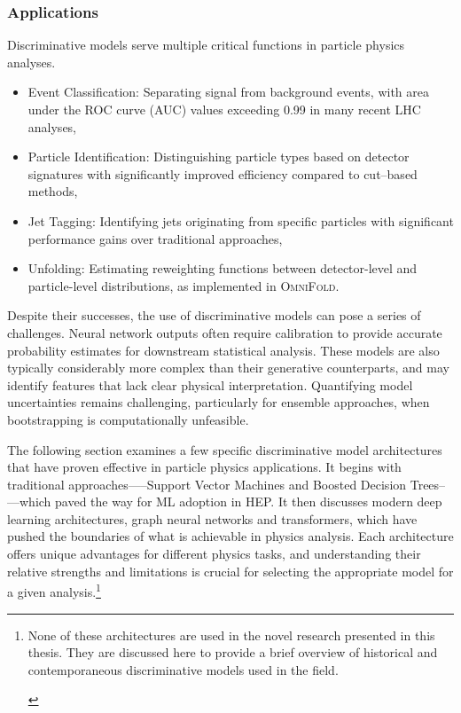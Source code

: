             \subsubsection{Applications}
                Discriminative models serve multiple critical functions in particle physics analyses.
                \begin{itemize}
                    \item Event Classification: Separating signal from background events, with area under the ROC curve (AUC) values exceeding 0.99 in many recent LHC analyses,
                    \item Particle Identification: Distinguishing particle types based on detector signatures with significantly improved efficiency compared to cut--based methods,
                    \item Jet Tagging: Identifying jets originating from specific particles with significant performance gains over traditional approaches,
                    \item Unfolding: Estimating reweighting functions between detector-level and particle-level distributions, as implemented in \textsc{OmniFold}.
                \end{itemize}
                
                Despite their successes, the use of discriminative models can pose a series of challenges.
                Neural network outputs often require calibration to provide accurate probability estimates for downstream statistical analysis.
                These models are also typically considerably more complex than their generative counterparts, and may identify features that lack clear physical interpretation.
                Quantifying model uncertainties remains challenging, particularly for ensemble approaches, when bootstrapping is computationally unfeasible.
                
                The following section examines a few specific discriminative model architectures that have proven effective in particle physics applications.
                It begins with traditional approaches—--Support Vector Machines and Boosted Decision Trees--—which paved the way for ML adoption in HEP.
                It then discusses modern deep learning architectures, graph neural networks and transformers, which have pushed the boundaries of what is achievable in physics analysis.
                Each architecture offers unique advantages for different physics tasks, and understanding their relative strengths and limitations is crucial for selecting the appropriate model for a given analysis.\footnote{\begin{note}
                    {None of these architectures are used in the novel research presented in this thesis.
                    They are discussed here to provide a brief overview of historical and contemporaneous discriminative models used in the field.}
                \end{note}}
